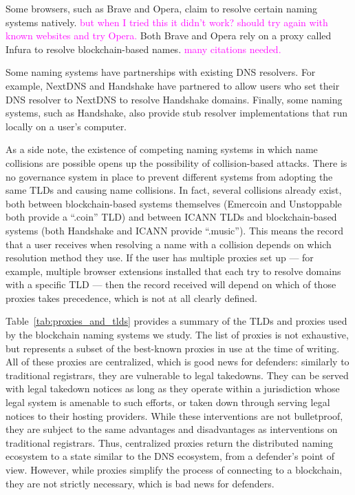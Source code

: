 \documentclass[10pt,sigconf,letterpaper]{acmart}
\newcommand{\randall}{\ding{110}\ding{43}\textcolor{magenta}}
\newcommand{\randall}{}
\begin{document}
Some browsers, such as Brave and Opera, claim to resolve certain naming systems 
natively. \randall{but when I tried this it didn't work? should try again with 
known websites and try Opera.} Both Brave and Opera rely on a proxy called 
Infura to resolve blockchain-based names. \randall{many citations needed.} 

Some naming systems have partnerships with existing DNS resolvers. For example, 
NextDNS and Handshake have partnered to allow users who set their DNS resolver 
to NextDNS to resolve Handshake domains. Finally, some naming systems, such as 
Handshake, also provide stub resolver implementations that run locally on a 
user's computer. 

As a side note, the existence of competing naming systems in which name 
collisions are possible 
opens up the possibility of collision-based attacks. There is no governance 
system in place to prevent different systems from adopting the same TLDs and 
causing name collisions. In fact, several collisions already exist, both 
between blockchain-based systems themselves (Emercoin and Unstoppable both 
provide a ``.coin'' TLD) and between ICANN TLDs and blockchain-based systems 
(both Handshake and ICANN provide ``.music''). 
This means the record that a user receives when resolving a name with a 
collision depends on which resolution method they use. If the user has multiple 
proxies set up --- for example, multiple browser extensions installed that each 
try to resolve domains with a specific TLD --- then the record received will 
depend on which of those proxies takes precedence, which is not at all clearly 
defined. 

Table~\ref{tab:proxies_and_tlds} provides a summary of the TLDs and proxies 
used by the blockchain naming systems we study. The list of proxies is not exhaustive, but 
represents 
a subset of the best-known proxies in use at the time of writing.
All of these proxies are 
centralized, which is good news for defenders: similarly to traditional 
registrars, they are vulnerable to legal takedowns. They can be served with 
legal takedown notices as long as they operate within a jurisdiction whose 
legal system is amenable to such efforts, or taken down through serving legal 
notices to their hosting providers. While these interventions are not 
bulletproof, they are subject to the same advantages and disadvantages as 
interventions on traditional registrars. Thus, centralized proxies return the 
distributed naming ecosystem to a state similar to the DNS ecosystem, from a 
defender's point of view. However, while proxies simplify the process of 
connecting to a blockchain, they are not strictly necessary, which is bad news 
for defenders.
\end{document}
